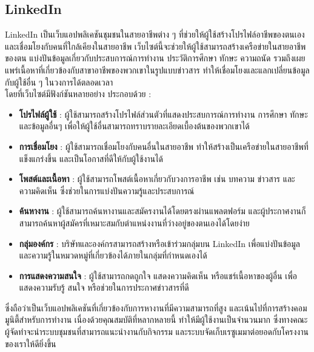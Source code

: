 \subsection{LinkedIn}
LinkedIn เป็นเว็บแอปพลิเคชันชุมชนในสายอาชีพต่าง ๆ ที่ช่วยให้ผู้ใช้สร้างโปรไฟล์อาชีพของตนเองและเชื่อมโยงกับคนที่ใกล้เคียงในสายอาชีพ
เว็บไซต์นี้จะช่วยให้ผู้ใช้สามารถสร้างเครือข่ายในสายอาชีพของตน แบ่งปันข้อมูลเกี่ยวกับประสบการณ์การทำงาน ประวัติการศึกษา ทักษะ ความถนัด
รวมถึงเผยแพร่เนื้อหาที่เกี่ยวข้องกับสาขาอาชีพของพวกเขาในรูปแบบข่าวสาร ทำให้เชื่อมโยงและแลกเปลี่ยนข้อมูลกับผู้ใช้อื่น ๆ ในวงการได้ตลอดเวลา \\
โดยที่เว็บไซต์มีฟังก์ชันหลายอย่าง ประกอบด้วย :
\begin{itemize}
      \item \textbf{โปรไฟล์ผู้ใช้} : ผู้ใช้สามารถสร้างโปรไฟล์ส่วนตัวที่แสดงประสบการณ์การทำงาน การศึกษา ทักษะ และข้อมูลอื่นๆ เพื่อให้ผู้ใช้อื่นสามารถทราบรายละเอียดเบื้องต้นของพวกเขาได้
      \item \textbf{การเชื่อมโยง} : ผู้ใช้สามารถเชื่อมโยงกับคนอื่นในสายอาชีพ ทำให้สร้างเป็นเครือข่ายในสายอาชีพที่แข็งแกร่งขึ้น และเป็นโอกาสที่ดีให้กับผู้ใช้งานได้
      \item \textbf{โพสต์และเนื้อหา} : ผู้ใช้สามารถโพสต์เนื้อหาเกี่ยวกับวงการอาชีพ เช่น บทความ ข่าวสาร และความคิดเห็น ซึ่งช่วยในการแบ่งปันความรู้และประสบการณ์
      \item \textbf{ค้นหางาน} : ผู้ใช้สามารถค้นหางานและสมัครงานได้โดยตรงผ่านแพลตฟอร์ม และผู้ประกาศงานก็สามารถค้นหาผู้สมัครที่เหมาะสมกับตำแหน่งงานที่ว่างอยู่ของตนเองได้โดยง่าย
      \item \textbf{กลุ่มองค์กร} : บริษัทและองค์กรสามารถสร้างหรือเข้าร่วมกลุ่มบน LinkedIn เพื่อแบ่งปันข้อมูลและความรู้ในหมวดหมู่ที่เกี่ยวข้องได้ภายในกลุ่มที่กำหนดเองได้
      \item \textbf{การแสดงความสนใจ} : ผู้ใช้สามารถกดถูกใจ แสดงความคิดเห็น หรือแชร์เนื้อหาของผู้อื่น เพื่อแสดงความรับรู้ สนใจ หรือช่วยในการประกาศข่าวสารที่ดี
\end{itemize}
\par ซึ่งถือว่าเป็นเว็บแอปพลิเคชันที่เกี่ยวข้องกับการหางานที่มีความสามารถที่สูง และเน้นไปที่การสร้างคอมมูนิตี้สำหรับการทำงาน เนื่องด้วยคุณสมบัติที่หลากหลายนี้
ทำให้มีผู้ใช้งานเป็นจำนวนมาก ซึ่งทางคณะผู้จัดทำจะนำระบบชุมชนที่สามารถแนะนำงานกับกิจกรรม และระบบจัดเก็บเรซูเมมาต่อยอดกับโครงงานของเราให้ดียิ่งขึ้น

